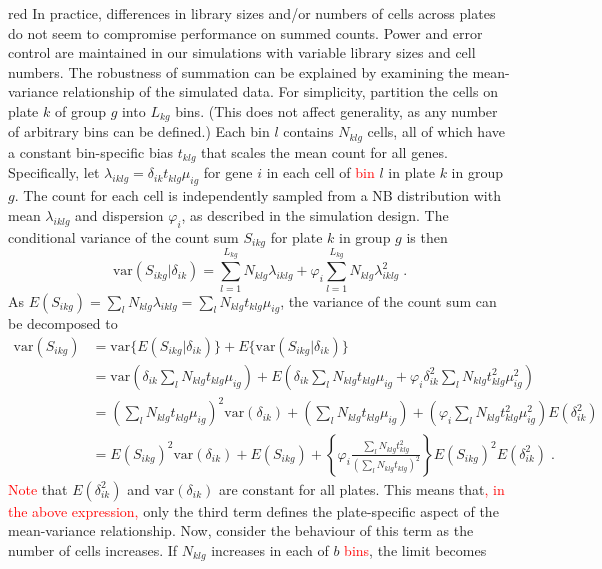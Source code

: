 \documentclass{article}
\newcommand\revised[1]{\textcolor{red}{#1}}
\begin{document}
\begin{color}{red}
In practice, differences in library sizes and/or numbers of cells across plates do not seem to compromise performance on summed counts.
Power and error control are maintained in our simulations with variable library sizes and cell numbers.
The robustness of summation can be explained by examining the mean-variance relationship of the simulated data.
For simplicity, partition the cells on plate $k$ of group $g$ into $L_{kg}$ bins.
(This does not affect generality, as any number of arbitrary bins can be defined.)
Each bin $l$ contains $N_{klg}$ cells, all of which have a constant bin-specific bias $t_{klg}$ that scales the mean count for all genes.
Specifically, let $\lambda_{iklg} = \delta_{ik}t_{klg}\mu_{ig}$ for gene $i$ in each cell of \revised{bin} $l$ in plate $k$ in group $g$.
The count for each cell is independently sampled from a NB distribution with mean $\lambda_{iklg}$ and dispersion $\varphi_i$, as described in the simulation design.
The conditional variance of the count sum $S_{ikg}$ for plate $k$ in group $g$ is then
\[
    \mbox{var}(S_{ikg} | \delta_{ik}) = \sum_{l=1}^{L_{kg}} N_{klg} \lambda_{iklg}  + \varphi_{i} \sum_{l=1}^{L_{kg}} N_{klg} \lambda_{iklg}^2 \;.
\]
As $E(S_{ikg}) = \sum_{l} N_{klg}\lambda_{iklg} = \sum_{l} N_{klg} t_{klg} \mu_{ig}$, the variance of the count sum can be decomposed to
\begin{align*}
    \mbox{var}(S_{ikg}) 
    &= \mbox{var}\{E(S_{ikg} | \delta_{ik} ) \} + E\{ \mbox{var}(S_{ikg} | \delta_{ik}) \}\\
    &= \mbox{var}\left(\delta_{ik}\sum_{l} N_{klg} t_{klg}\mu_{ig}\right) + E\left(\delta_{ik}\sum_{l}  N_{klg}t_{klg}\mu_{ig}  + \varphi_{i} \delta_{ik}^2 \sum_{l}  N_{klg}t_{klg}^2\mu_{ig}^2\right)\\
    &= \left(\sum_{l} N_{klg} t_{klg}\mu_{ig} \right)^2 \mbox{var}(\delta_{ik}) + \left(\sum_{l} N_{klg} t_{klg}\mu_{ig}\right) + \left( \varphi_i \sum_{l}  N_{klg}t_{klg}^2\mu_{ig}^2 \right) E(\delta_{ik}^2) \\
    &= E(S_{ikg})^2 \mbox{var}(\delta_{ik}) + E(S_{ikg}) + \left\{ \varphi_i \frac{\sum_{l} N_{klg} t_{klg}^2}{ (\sum_{l} N_{klg} t_{klg})^2}  \right\} E(S_{ikg})^2 E(\delta_{ik}^2) \;. 
\end{align*}
\revised{Note} that $E(\delta_{ik}^2)$ and $\mbox{var}(\delta_{ik})$ are constant for all plates.
This means that\revised{, in the above expression,} only the third term defines the plate-specific aspect of the mean-variance relationship.
Now, consider the behaviour of this term as the number of cells increases.
If $N_{klg}$ increases in each of $b$ \revised{bins}, the limit becomes

\end{color}
\end{document}
